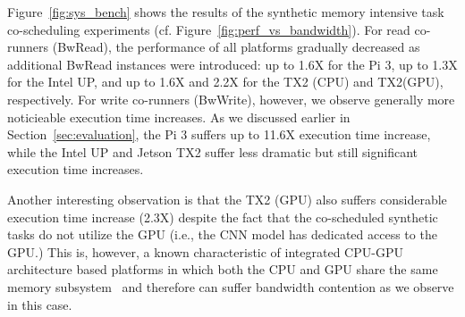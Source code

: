 Figure~\ref{fig:sys_bench} shows the results of the synthetic memory
intensive task co-scheduling experiments
(cf. Figure~\ref{fig:perf_vs_bandwidth}).
For read co-runners (BwRead), the performance of all platforms
gradually decreased as additional BwRead instances were introduced: up
to 1.6X for the Pi 3, up to 1.3X for the Intel UP, and up to 1.6X and 2.2X for
the TX2 (CPU) and TX2(GPU), respectively.
For write co-runners (BwWrite), however, we observe generally more
noticieable execution time increases. As we discussed
earlier in Section~\ref{sec:evaluation}, the Pi 3 suffers up to 11.6X
execution time increase, while the Intel UP and Jetson TX2 suffer less
dramatic but still significant execution time increases.


Another interesting observation is that the TX2 (GPU) also suffers
considerable execution time increase (2.3X) despite the fact that the
co-scheduled synthetic tasks do not utilize the GPU (i.e., the CNN
model has dedicated access to the GPU.) This is, however, a 
known characteristic of integrated CPU-GPU architecture based
platforms in which both the CPU and GPU share the same memory
subsystem~\cite{Ali2017} and therefore can suffer bandwidth contention
as we observe in this case.



